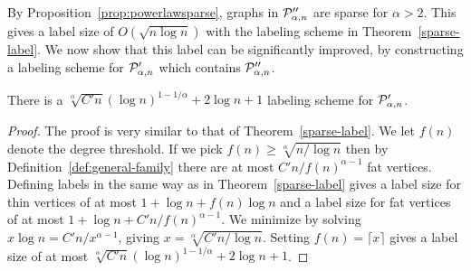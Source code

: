 
By Proposition~\ref{prop:powerlawsparse}, graphs in $ \mathcal{P}''_{\alpha,n}$ are sparse for $\alpha > 2$. This gives a label size of $O(\sqrt{n\log n})$ with the labeling scheme in Theorem~\ref{sparse-label}. We now show that this label can be significantly improved, by constructing a labeling scheme for $ \mathcal{P}'_{\alpha,n}$ which contains $ \mathcal{P}''_{\alpha,n}$.

\begin{theorem}\label{prop:labelingMain}
 There is a $\sqrt[\alpha]{C'n}(\log n)^{1 - 1/\alpha} + 2\log n + 1$ labeling scheme for $ \mathcal{P}'_{\alpha,n}$.
\end{theorem}
\begin{proof}
The proof is very similar to that of Theorem~\ref{sparse-label}. We let $f(n)$ denote the degree threshold. If we pick $f(n)\geq \sqrt[\alpha]{n/\log n}$ then by Definition~\ref{def:general-family}  there are at most $C'n / f(n)^{\alpha -1}$ fat vertices. Defining labels in the same way as in Theorem~\ref{sparse-label} gives a label size for thin vertices of at most $1 + \log n + f(n)\log n$ and a label size for fat vertices of at most
$1 + \log n + C'n / f(n)^{\alpha -1}$.
We minimize by solving
$x \log n = C'n / x^{\alpha -1}$, giving $x = \sqrt[\alpha]{C'n/\log n}$. Setting $f(n) = \lceil x\rceil$ gives a label size of at most $\sqrt[\alpha]{C'n}(\log n)^{1 - 1/\alpha} + 2\log n + 1$.
\end{proof}
